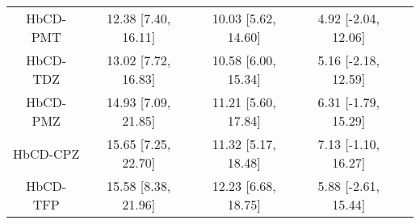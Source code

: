 \documentclass[8pt]{article}
\begin{document}
\begin{center}
\begin{footnotesize}
\begin{longtable}{|ccccc|}
HbCD-PMT & 12.38 [7.40, 16.11] & 10.03 [5.62, 14.60] & 4.92 [-2.04, 12.06] \\
HbCD-TDZ & 13.02 [7.72, 16.83] & 10.58 [6.00, 15.34] & 5.16 [-2.18, 12.59] \\
HbCD-PMZ & 14.93 [7.09, 21.85] & 11.21 [5.60, 17.84] & 6.31 [-1.79, 15.29] \\
HbCD-CPZ & 15.65 [7.25, 22.70] & 11.32 [5.17, 18.48] & 7.13 [-1.10, 16.27] \\
HbCD-TFP & 15.58 [8.38, 21.96] & 12.23 [6.68, 18.75] & 5.88 [-2.61, 15.44] \\
\end{longtable}
\end{footnotesize}
\end{center}
\end{document}
